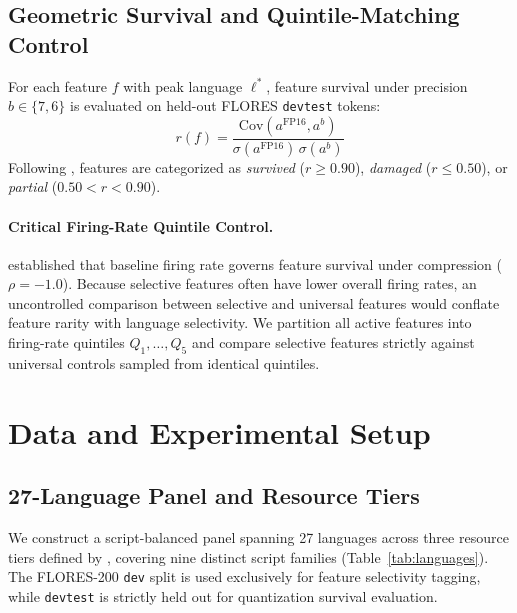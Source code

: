 \documentclass[11pt]{article}
\begin{document}
\subsection{Geometric Survival and Quintile-Matching Control}
For each feature $f$ with peak language $\ell^*$, feature survival under precision $b \in \{7, 6\}$ is evaluated on held-out FLORES \texttt{devtest} tokens:
\begin{equation}
\label{eq:pearson}
r(f) = \frac{\mathrm{Cov}(a^{\text{FP16}}, a^b)}{\sigma(a^{\text{FP16}})\,\sigma(a^b)}
\end{equation}
Following \citet{duan2026perplexity}, features are categorized as \emph{survived} ($r \ge 0.90$), \emph{damaged} ($r \le 0.50$), or \emph{partial} ($0.50 < r < 0.90$).

\paragraph{Critical Firing-Rate Quintile Control.}
\citet{borobia2026how} established that baseline firing rate governs feature survival under compression ($\rho = -1.0$). Because selective features often have lower overall firing rates, an uncontrolled comparison between selective and universal features would conflate feature rarity with language selectivity. We partition all active features into firing-rate quintiles $Q_1, \dots, Q_5$ and compare selective features strictly against universal controls sampled from identical quintiles.


\section{Data and Experimental Setup}

\subsection{27-Language Panel and Resource Tiers}
We construct a script-balanced panel spanning 27 languages across three resource tiers defined by \citet{joshi2020state}, covering nine distinct script families (Table~\ref{tab:languages}). The FLORES-200 \texttt{dev} split is used exclusively for feature selectivity tagging, while \texttt{devtest} is strictly held out for quantization survival evaluation.
\end{document}
